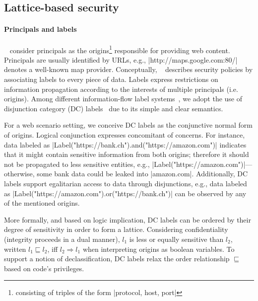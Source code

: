 \subsection{Lattice-based security}

\paragraph{Principals and labels}

\sys~ consider principals as the origins\footnote{consisting of triples of the
  form \js|{protocol, host, port}|} responsible for providing web
content. Principals are usually identified by URLs, e.g., 
\js|http://maps.google.com:80/| denotes a well-known map provider.
Conceptually, \sys~ describes security policies by associating labels to every
piece of data. Labels express restrictions on information propagation according
to the interests of multiple principals (i.e. origins). Among different
information-flow label systems~\cite{GenLabels}, we adopt the use of disjunction
category (DC) labels~\cite{stefan:2011:dclabels} due to its simple and clear
semantics.

For a web scenario setting, we conceive DC labels as the conjunctive normal form
of origins. Logical conjunction expresses concomitant of concerns. For instance,
data labeled as \js|Label("https://bank.ch").and("https://amazon.com")|
indicates that it might contain sensitive information from both origins;
therefore it should not be propagated to less sensitive entities, e.g.,
\js|Label("https://amazon.com")|---otherwise, some bank data could be leaked
into \js|amazon.com|. Additionally, DC labels support egalitarian access to data
through disjunctions, e.g., data labeled as 
\js|Label("https://amazon.com").or("https://bank.ch")| can be
observed by any of the mentioned origins. 

More formally, and based on logic implication, DC labels can be ordered by their
degree of sensitivity in order to form a lattice. Considering confidentiality
(integrity proceeds in a dual manner), $l_1$ is less or equally sensitive than
$l_2$, written $l_1 \sqsubseteq l_2$, iff $l_2 \Rightarrow l_1$ when
interpreting origins as boolean variables. To support a notion of 
declassification, DC labels relax the order relationship $\sqsubseteq$ based
on code's privileges.  


